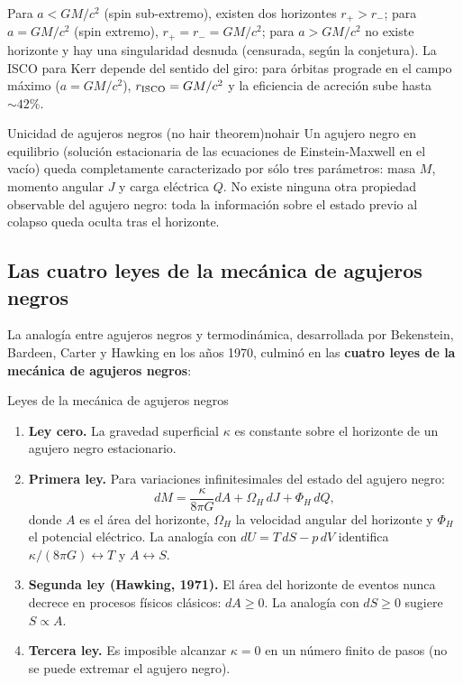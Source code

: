 Para $a < GM/c^2$ (spin sub-extremo), existen dos horizontes $r_+ > r_-$; para $a = GM/c^2$ (spin extremo), $r_+ = r_- = GM/c^2$; para $a > GM/c^2$ no existe horizonte y hay una singularidad desnuda (censurada, según la conjetura). La ISCO para Kerr depende del sentido del giro: para órbitas prograde en el campo máximo ($a = GM/c^2$), $r_{\rm ISCO} = GM/c^2$ y la eficiencia de acreción sube hasta $\sim 42\%$.

\begin{teorema}{Unicidad de agujeros negros (no hair theorem)}{nohair}
Un agujero negro en equilibrio (solución estacionaria de las ecuaciones de Einstein-Maxwell en el vacío) queda completamente caracterizado por sólo tres parámetros: masa $M$, momento angular $J$ y carga eléctrica $Q$. No existe ninguna otra propiedad observable del agujero negro: toda la información sobre el estado previo al colapso queda oculta tras el horizonte.
\end{teorema}

\subsection{Las cuatro leyes de la mecánica de agujeros negros}

La analogía entre agujeros negros y termodinámica, desarrollada por Bekenstein, Bardeen, Carter y Hawking en los años 1970, culminó en las \textbf{cuatro leyes de la mecánica de agujeros negros}:

\begin{proposicion}{Leyes de la mecánica de agujeros negros}{}
\begin{enumerate}[leftmargin=2em, label=\textbf{Ley \arabic{enumi}a.}, start=0]
  \item \textbf{Ley cero.} La gravedad superficial $\kappa$ es constante sobre el horizonte de un agujero negro estacionario.
  \item \textbf{Primera ley.} Para variaciones infinitesimales del estado del agujero negro:
  \begin{equation}
    dM = \frac{\kappa}{8\pi G}dA + \Omega_H\,dJ + \Phi_H\,dQ,
    \label{eq:primera_ley_BH}
  \end{equation}
  donde $A$ es el área del horizonte, $\Omega_H$ la velocidad angular del horizonte y $\Phi_H$ el potencial eléctrico. La analogía con $dU = T\,dS - p\,dV$ identifica $\kappa/(8\pi G) \leftrightarrow T$ y $A \leftrightarrow S$.
  \item \textbf{Segunda ley (Hawking, 1971).} El área del horizonte de eventos nunca decrece en procesos físicos clásicos: $dA \geq 0$. La analogía con $dS \geq 0$ sugiere $S \propto A$.
  \item \textbf{Tercera ley.} Es imposible alcanzar $\kappa = 0$ en un número finito de pasos (no se puede extremar el agujero negro).
\end{enumerate}
\end{proposicion}

